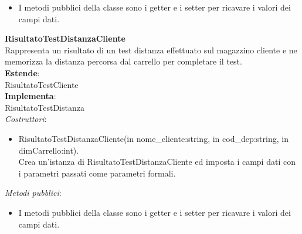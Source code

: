 \begin{itemize}
    \item I metodi pubblici della classe sono i getter e i setter per ricavare i valori dei campi dati.\\
\end{itemize} 
\textbf{RisultatoTestDistanzaCliente}\\
Rappresenta un risultato di un test distanza effettuato sul magazzino cliente e ne memorizza la distanza percorsa dal carrello per completare il test.\\
\textbf{Estende}:\\
RisultatoTestCliente\\
\textbf{Implementa}:\\
RisultatoTestDistanza\\
\textit{Costruttori}:\\
\begin{itemize}
    \item RisultatoTestDistanzaCliente(in nome\_cliente:string, in cod\_dep:string, in dimCarrello:int).\\
    Crea un'istanza di RisultatoTestDistanzaCliente ed imposta i campi dati con i parametri passati come parametri formali.\\
\end{itemize}
\textit{Metodi pubblici}:\\
\begin{itemize}
    \item I metodi pubblici della classe sono i getter e i setter per ricavare i valori dei campi dati.\\
\end{itemize} 

